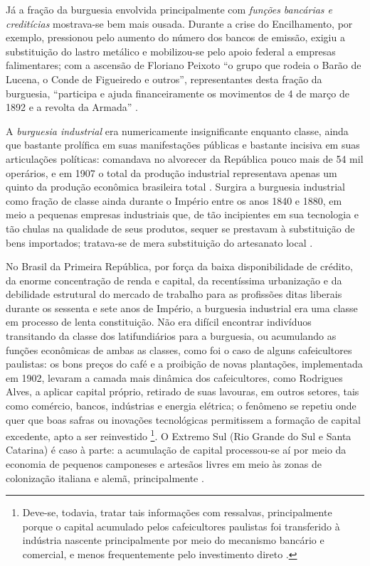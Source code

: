 Já a fração da burguesia envolvida principalmente com \textit{funções bancárias e creditícias} mostrava-se bem mais ousada. Durante a crise do Encilhamento, por exemplo, pressionou pelo aumento do número dos bancos de emissão, exigiu a substituição do lastro metálico e mobilizou-se pelo apoio federal a empresas falimentares; com a ascensão de Floriano Peixoto ``o grupo que rodeia o Barão de Lucena, o Conde de Figueiredo e outros'', representantes desta fração da burguesia, ``participa e ajuda financeiramente os movimentos de 4 de março de 1892 e a revolta da Armada'' \cite[pp.~158-159]{CARONE1970inst}.

A \textit{burguesia industrial} era numericamente insignificante enquanto classe, ainda que bastante prolífica em suas manifestações públicas e bastante incisiva em suas articulações políticas: comandava no alvorecer da República pouco mais de 54 mil operários, e em 1907 o total da produção industrial representava apenas um quinto da produção econômica brasileira total \cite[pp.~24-25]{gorender_burguesia_1990}. Surgira a burguesia industrial como fração de classe ainda durante o Império entre os anos 1840 e 1880, em meio a pequenas empresas industriais que, de tão incipientes em sua tecnologia e tão chulas na qualidade de seus produtos, sequer se prestavam à substituição de bens importados; tratava-se de mera substituição do artesanato local \cite[pp.~13-14]{gorender_burguesia_1990}. 

No Brasil da Primeira República, por força da baixa disponibilidade de crédito, da enorme concentração de renda e capital, da recentíssima urbanização e da debilidade estrutural do mercado de trabalho para as profissões ditas liberais durante os sessenta e sete anos de Império, a burguesia industrial era uma classe em processo de lenta constituição. Não era difícil encontrar indivíduos transitando da classe dos latifundiários para a burguesia, ou acumulando as funções econômicas de ambas as classes, como foi o caso de alguns cafeicultores paulistas: os bons preços do café e a proibição de novas plantações, implementada em 1902, levaram a camada mais dinâmica dos cafeicultores, como Rodrigues Alves, a aplicar capital próprio, retirado de suas lavouras, em outros setores, tais como comércio, bancos, indústrias e energia elétrica; o fenômeno se repetiu onde quer que boas safras ou inovações tecnológicas permitissem a formação de capital excedente, apto a ser reinvestido \cite[p.~147]{CARONE1970inst}\footnote{Deve-se, todavia, tratar tais informações com ressalvas, principalmente porque o capital acumulado pelos cafeicultores paulistas foi transferido à indústria nascente principalmente por meio do mecanismo bancário e comercial, e menos frequentemente pelo investimento direto \cite[p.~38]{gorender_burguesia_1990}.}. O Extremo Sul (Rio Grande do Sul e Santa Catarina) é caso à parte: a acumulação de capital processou-se aí por meio da economia de pequenos camponeses e artesãos livres em meio às zonas de colonização italiana e alemã, principalmente \cite[p.~31]{gorender_burguesia_1990}.

